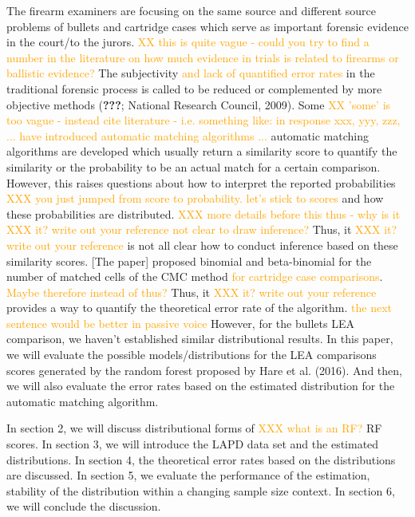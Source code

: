\documentclass[]{elsarticle} %
\begin{document}
The firearm examiners are focusing on the same source and different
source problems of bullets and cartridge cases which serve as important
forensic evidence in the court/to the jurors.
{\textcolor{orange}{XX this is quite vague - could you try to find a number in the literature on how much evidence in trials is related to firearms or ballistic evidence?}}
The subjectivity
{\textcolor{orange}{and lack of quantified error rates}} in the
traditional forensic process is called to be reduced or complemented by
more objective methods ({\textbf{???}}; National Research Council,
2009). Some
{\textcolor{orange}{XX 'some' is too vague - instead cite literature - i.e. something like: in response xxx, yyy, zzz, ... have introduced automatic matching algorithms ...}}
automatic matching algorithms are developed which usually return a
similarity score to quantify the similarity or the probability to be an
actual match for a certain comparison. However, this raises questions
about how to interpret the reported probabilities
{\textcolor{orange}{XXX you just jumped from score to probability. let's stick to scores}}
and how these probabilities are distributed.
{\textcolor{orange}{XXX more details before this thus - why is it {\textcolor{orange}{XXX it? write out your reference}} not clear to draw inference?}}
Thus, it {\textcolor{orange}{XXX it? write out your reference}} is not
all clear how to conduct inference based on these similarity scores.
{[}The paper{]} proposed binomial and beta-binomial for the number of
matched cells of the CMC method
{\textcolor{orange}{for cartridge case comparisons}}.
{\textcolor{orange}{Maybe therefore instead of thus?}} Thus, it
{\textcolor{orange}{XXX it? write out your reference}} provides a way to
quantify the theoretical error rate of the algorithm.
{\textcolor{orange}{the next sentence would be better in passive voice}}
However, for the bullets LEA comparison, we haven't established similar
distributional results. In this paper, we will evaluate the possible
models/distributions for the LEA comparisons scores generated by the
random forest proposed by Hare et al. (2016). And then, we will also
evaluate the error rates based on the estimated distribution for the
automatic matching algorithm.

In section 2, we will discuss distributional forms of
{\textcolor{orange}{XXX what is an RF?}} RF scores. In section 3, we
will introduce the LAPD data set and the estimated distributions. In
section 4, the theoretical error rates based on the distributions are
discussed. In section 5, we evaluate the performance of the estimation,
stability of the distribution within a changing sample size context. In
section 6, we will conclude the discussion.
\end{document}
